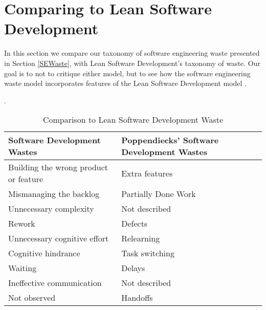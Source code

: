 



\section{Comparing to Lean Software Development}
\label{LeanSoftwareDevelopmentComarison}

In this section we compare our taxonomy of software engineering waste presented in Section \ref{SEWaste}, with Lean Software Development's taxonomy of waste. Our goal is to not to critique either model, but to see how the software engineering waste model incorporates features of the Lean Software Development model \cite{PoppendieckConceptToCash}. 

 \cite{GlaserTheoreticalSensitivity}. 


\begin{table}[t]
\renewcommand{\arraystretch}{1.5}
\centering
\caption{Comparison to Lean Software Development Waste}
\label{LeanSoftwareDevelopmentComparison}
\begin{tabular}{|l|l|}
\hline
Software Development Wastes           & Poppendiecks' Software Development Wastes \\ \hline
Building the wrong product or feature & Extra features                            \\ \hline
Mismanaging the backlog               & Partially Done Work                            \\ \hline
Unnecessary complexity                & Not described                             \\ \hline
Rework                                & Defects                                   \\ \hline
Unnecessary cognitive effort          & Relearning                             \\ \hline
Cognitive hindrance           & Task switching                             \\ \hline
Waiting                               & Delays                                    \\ \hline
Ineffective communication             & Not described                             \\ \hline
Not observed                          & Handoffs                                  \\ \hline
\end{tabular}
\end{table}
